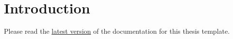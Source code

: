 \chapter{Introduction}\label{chap:introduction}

Please read the \href{https://github.com/HKFoggyU/hkust-thesis/releases}{latest version} of the documentation for this thesis template.